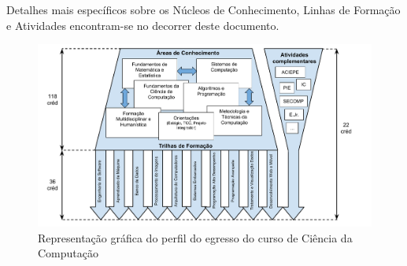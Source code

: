 Detalhes mais específicos sobre os Núcleos de Conhecimento, Linhas de Formação e Atividades encontram-se no decorrer deste documento. 

\begin{figure}[htb!]
    \centering
    \includegraphics[width=\columnwidth]{bcc/imagens/perfil_egresso.pdf}
    \caption{Representação gráfica do perfil do egresso do curso de Ciência da Computação}
    \label{fig:perfil_egresso}
\end{figure}